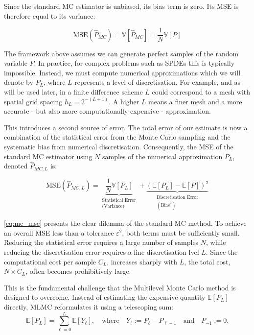 Since the standard MC estimator is unbiased, its bias term is zero. 
Its MSE is therefore equal to its variance:

\begin{equation*}
    \text{MSE}(\hat{P}_{MC}) = \mathbb{V}[\hat{P}_{MC}] = \frac{1}{N}\mathbb{V}[P]
\end{equation*}

The framework above assumes we can generate perfect samples of the random 
variable $P$. In practice, for complex problems such as SPDEs this is typically impossible.
Instead, we must compute numerical approximations which we will denote by $P_L$, where $L$ 
represents a level of discretisation. For example, and as will be used later,
in a finite difference scheme $L$ could correspond to a mesh with spatial grid spacing 
$h_L = 2^{-(L+1)}$. A higher $L$ means a finer mesh and a more accurate - but also more 
computationally expensive - approximation. 

This introduces a second source of error. The total error of our estimate is now a combination 
of the statistical error from the Monte Carlo sampling and the systematic bias from
numerical discretisation. Consequently, the MSE of the standard MC estimator using 
$N$ samples of the numerical approximation $P_L$, denoted $\hat{P}_{MC, L}$ is:

\begin{equation}\label{eq:mc_mse}
    \text{MSE}(\hat{P}_{MC,L}) = \underbrace{\frac{1}{N}\mathbb{V}[P_L]}_{\substack{\text{Statistical Error} \\ \text{(Variance)}}} + 
    \underbrace{(\mathbb{E}[P_L] - \mathbb{E}[P])^2}_{\substack{\text{Discretisation Error} \\ (\text{Bias}^2)}}
\end{equation}

\eqref{eq:mc_mse} presents the clear dilemma of the standard MC method. To achieve an overall
MSE less than a tolerance  $\varepsilon^2$, both terms must be sufficiently small. 
Reducing the statistical error requires a large number of samples $N$, while 
reducing the discretisation error requires a fine discretisation lvel $L$.
Since the computational cost per sample $C_L$, increases sharply with $L$, the total 
cost, $N \times C_L$, often becomes prohibitively large. 

This is the fundamental challenge that the Multilevel Monte Carlo method is designed to overcome. 
Instead of estimating the expensive quantity $\mathbb{E}[P_L]$ directly, MLMC reformulates it 
using a telescoping sum:
\begin{equation*}
    \mathbb{E}[P_L] = \sum_{\ell=0}^L \mathbb{E}[Y_\ell], \quad \text{where} \quad 
    Y_\ell := P_\ell - P_{\ell-1} \quad \text{and} \quad P_{-1} := 0.
\end{equation*}

